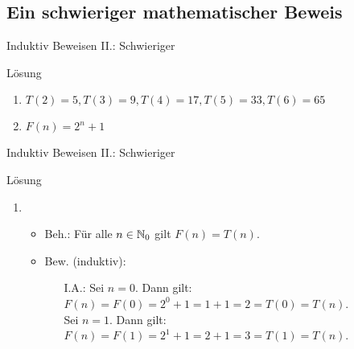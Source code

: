 \subsection{Ein schwieriger mathematischer Beweis}
\begin{frame}{Induktiv Beweisen II.: Schwieriger}
	\begin{block}{Lösung}
		\begin{enumerate}
			\item $ T(2)=5,T(3)=9, T(4)=17, T(5)=33, T(6)=65$
			\item $F(n) = 2^n+1$
			\setcounter{kevin}{\value{enumi}}
		\end{enumerate}
	\end{block}
\end{frame}
\begin{frame}{Induktiv Beweisen II.: Schwieriger}
	\begin{block}{Lösung}
		\begin{enumerate}
			\setcounter{enumi}{\value{kevin}}
			\item \begin{itemize}
		 		\item Beh.: Für alle $n \in \mathbb{N}_0$ gilt $F(n) = T(n)$.
		 		\item Bew. (induktiv): 
				\begin{itemize}
					\item[I.A.:]
								Sei $n=0$. Dann gilt: \\ 
								\qquad $F(n)=F(0)=2^0+1=1+1=2=T(0)=T(n)$.\\
							 	Sei $n=1$. Dann gilt: \\
							 	\qquad $F(n)=F(1)=2^1+1=2+1=3=T(1)=T(n)$.
				\end{itemize}
		 	\end{itemize}
		\end{enumerate}		 					  
	\end{block}
\end{frame}
